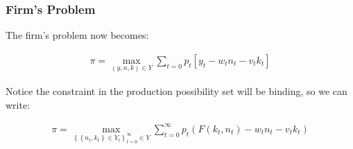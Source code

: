 \documentclass[10pt]{article}
\begin{document}
\subsubsection{Firm's Problem}

The firm's problem now becomes:

\begin{align}
    \pi=\max _{(y, n, k) \in Y} \sum_{t=0} p_t\left[y_t-w_t n_t-v_t k_t\right]
\end{align}


Notice the constraint in the production possibility set will be binding, 
so we can write:

\begin{align}
    \pi=\max _{\left\{\left\{n_t, k_t\right\} \in Y_t\right\}_{t=0}^{\infty} \in Y} \sum_{t=0}^{\infty} p_t\left(F\left(k_t, n_t\right)-w_t n_t-v_t k_t\right)
\end{align}
\end{document}
